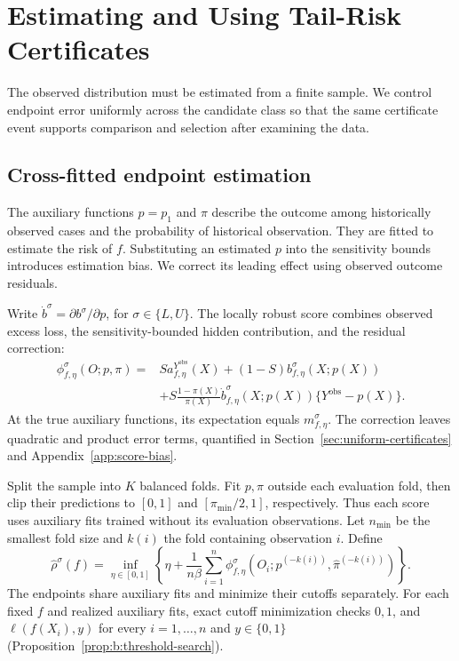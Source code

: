\section{Estimating and Using Tail-Risk Certificates}
\label{sec:learning}
The observed distribution must be estimated from a finite sample. We control endpoint error uniformly across the candidate class so that the same certificate event supports comparison and selection after examining the data.

\subsection{Cross-fitted endpoint estimation}
\label{sec:estimation}
The auxiliary functions \(p=p_1\) and \(\pi\) describe the outcome among historically observed cases and the probability of historical observation. They are fitted to estimate the risk of \(f\). Substituting an estimated \(p\) into the sensitivity bounds introduces estimation bias. We correct its leading effect using observed outcome residuals.

Write \(\dot b^\sigma=\partial b^\sigma/\partial p\), for \(\sigma\in\{L,U\}\). The locally robust score combines observed excess loss, the sensitivity-bounded hidden contribution, and the residual correction:
\begin{equation}
 \begin{aligned}
 \phi^\sigma_{f,\eta}(O;p,\pi)
 ={}&S a^{Y^{\mathrm{obs}}}_{f,\eta}(X)
 +(1-S)b^\sigma_{f,\eta}(X;p(X))\\
 &+S\frac{1-\pi(X)}{\pi(X)}
 \dot b^\sigma_{f,\eta}(X;p(X))\{Y^{\mathrm{obs}}-p(X)\}.
 \end{aligned}
\label{eq:robust-score}
\end{equation}
At the true auxiliary functions, its expectation equals \(m^\sigma_{f,\eta}\). The correction leaves quadratic and product error terms, quantified in Section~\ref{sec:uniform-certificates} and Appendix~\ref{app:score-bias}.

Split the sample into \(K\) balanced folds. Fit \(p,\pi\) outside each evaluation fold, then clip their predictions to \([0,1]\) and \([\pi_{\min}/2,1]\), respectively. Thus each score uses auxiliary fits trained without its evaluation observations. Let \(n_{\min}\) be the smallest fold size and \(k(i)\) the fold containing observation \(i\). Define
\begin{equation}
 \widehat\rho^\sigma(f)
 =\inf_{\eta\in[0,1]}
 \left\{\eta+\frac1{n\beta}\sum_{i=1}^n
 \phi^\sigma_{f,\eta}\!\left(
 O_i;\widehat p^{(-k(i))},\widehat\pi^{(-k(i))}
 \right)\right\}.
\label{eq:crossfit-endpoint}
\end{equation}
The endpoints share auxiliary fits and minimize their cutoffs separately. For each fixed \(f\) and realized auxiliary fits, exact cutoff minimization checks \(0,1\), and \(\ell(f(X_i),y)\) for every \(i=1,\ldots,n\) and \(y\in\{0,1\}\) (Proposition~\ref{prop:b:threshold-search}).

